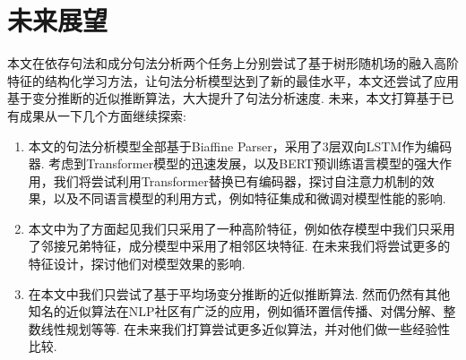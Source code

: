 \section{未来展望}
本文在依存句法和成分句法分析两个任务上分别尝试了基于树形随机场的融入高阶特征的结构化学习方法，让句法分析模型达到了新的最佳水平，本文还尝试了应用基于变分推断的近似推断算法，大大提升了句法分析速度.
未来，本文打算基于已有成果从一下几个方面继续探索:
\begin{enumerate}
    \item 本文的句法分析模型全部基于Biaffine Parser，采用了3层双向LSTM作为编码器.
          考虑到Transformer模型的迅速发展，以及BERT预训练语言模型的强大作用，我们将尝试利用Transformer替换已有编码器，探讨自注意力机制的效果，以及不同语言模型的利用方式，例如特征集成和微调对模型性能的影响.
    \item 本文中为了方面起见我们只采用了一种高阶特征，例如依存模型中我们只采用了邻接兄弟特征，成分模型中采用了相邻区块特征.
          在未来我们将尝试更多的特征设计，探讨他们对模型效果的影响.
    \item 在本文中我们只尝试了基于平均场变分推断的近似推断算法.
          然而仍然有其他知名的近似算法在NLP社区有广泛的应用，例如循环置信传播、对偶分解、整数线性规划等等.
          在未来我们打算尝试更多近似算法，并对他们做一些经验性比较.
\end{enumerate}